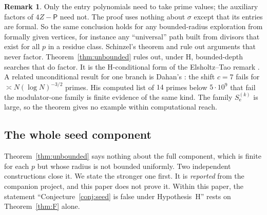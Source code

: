 \documentclass[11pt,reqno]{amsart}
\theoremstyle{definition}
\newtheorem{remark}[theorem]{Remark}
\newcommand{\Pp}{\mathsf P}
\newcommand{\Se}{S_{\mathrm e}}
\begin{document}
\begin{remark}\label{rem:unbounded}
Only the entry polynomials need to take prime values; the auxiliary
factors of $4Z-\Pp$ need not.  The proof uses nothing about $\sigma$
except that its entries are formal.  So the same conclusion holds for any
bounded-radius exploration from formally given vertices, for instance any
``universal'' path built from divisors that exist for all $p$ in a residue
class.  Schinzel's theorem and \cite[Prop.~1.6]{ET} rule out arguments
that never factor.  Theorem~\ref{thm:unbounded} rules out, under H,
bounded-depth searches that do factor.  It is the H-conditional form of
the Elsholtz--Tao remark \cite[\S1]{ET}.  A related unconditional result for one
branch is Dahan's \cite[Thm.~4.14]{Dahan}: the shift $c=7$ fails for
$\asymp N(\log N)^{-3/2}$ primes.  His computed list \cite[Prop.~3.8]{Dahan}
of $14$ primes below $5\cdot10^9$ that fail the modulator-one family is
finite evidence of the same kind.  The family $\Se^{(k)}$ is large, so the theorem gives
no example within computational reach.
\end{remark}

\subsection{The whole seed component}\label{sec:whole}
Theorem~\ref{thm:unbounded} says nothing about the full component, which
is finite for each $p$ but whose radius is not bounded uniformly.  Two
independent constructions close it.  We state the stronger one first.  It
is \emph{reported} from the companion project, and this paper does not
prove it.  Within this paper, the statement ``Conjecture~\ref{conj:seed} is
false under Hypothesis~H'' rests on Theorem~\ref{thm:F} alone.
\end{document}
